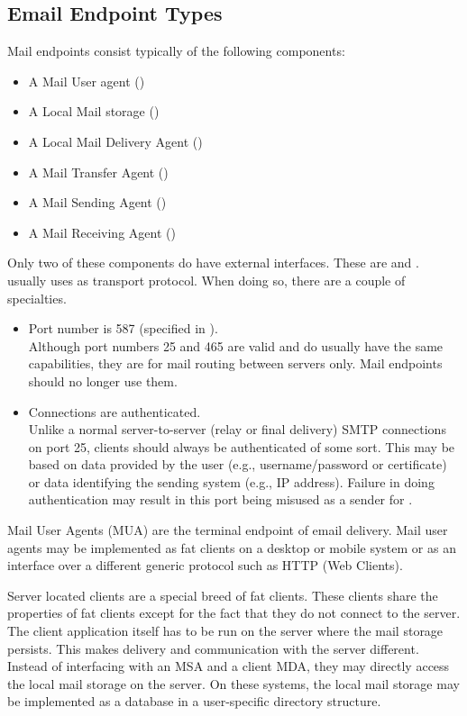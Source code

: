 \subsection{Email Endpoint Types}

Mail endpoints consist typically of the following components:
\begin{itemize}
	\item A Mail User agent ()
	\item A Local Mail storage ()
	\item A Local Mail Delivery Agent ()
	\item A Mail Transfer Agent ()
	\item A Mail Sending Agent ()
	\item A Mail Receiving Agent ()
\end{itemize}

Only two of these components do have external interfaces. These are  and .  usually uses  as transport protocol. When doing so, there are a couple of specialties. 
\begin{itemize}
	\item Port number is 587 (specified in \cite{RFC4409}).\\
	Although port numbers 25 and 465 are valid and do usually have the same capabilities, they are for mail routing between servers only. Mail endpoints should no longer use them.
	\item Connections are authenticated.\\
	Unlike a normal server-to-server (relay or final delivery) SMTP connections on port 25, clients should always be authenticated of some sort. This may be based on data provided by the user (e.g., username/password or certificate) or data identifying the sending system (e.g., IP address)\cite{RFC4409}. Failure in doing authentication may result in this port being misused as a sender for .
\end{itemize}

Mail User Agents (MUA) are the terminal endpoint of email delivery. Mail user agents may be implemented as fat clients on a desktop or mobile system or as an interface over a different generic protocol such as HTTP (Web Clients). 

Server located clients are a special breed of fat clients. These clients share the properties of fat clients except for the fact that they do not connect to the server. The client application itself has to be run on the server where the mail storage persists. This makes delivery and communication with the server different. Instead of interfacing with an MSA and a client MDA, they may directly access the local mail storage on the server. On these systems, the local mail storage may be implemented as a database in a user-specific directory structure.

